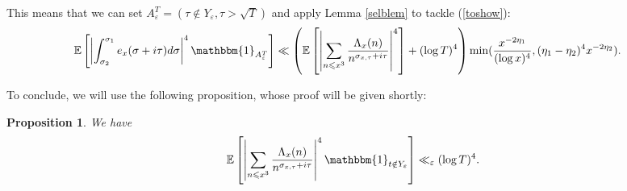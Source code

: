 \documentclass{article}
\newcommand{\1}{\mathds{1}}
\numberwithin{equation}{section}
\newcommand{\eps}{\varepsilon}
\renewcommand{\leq}{\leqslant}
\newcommand{\E}{\mathbb{E}}
\theoremstyle{plain} %
\newtheorem{proposition}[theorem]{Proposition}
\begin{document}
This means that we can set $A_\eps^T = ( \tau \notin Y_\eps, \tau > \sqrt{T})$ and apply Lemma \ref{selblem} to tackle (\ref{toshow}):
\begin{equation}
    \begin{split}
        \E\left[\left|\int_{\sigma_2}^{\sigma_1}e_x(\sigma + i \tau) d \sigma\right|^4\mathbbm{1}_{A_\eps^T}\right] & \ll \left( \E \left[ \left|\sum_{n \leq x^3} \frac{\Lambda_x(n)}{n^{\sigma_{x, \tau} + i\tau}} \right|^4 \right] + (\log T)^4\right)  \min(\frac{x^{-2\eta_1}}{(\log x)^4}, (\eta_1 - \eta_2)^4 x^{-2\eta_2}).
    \end{split}
\end{equation}

To conclude, we will use the following proposition, whose proof will be given shortly:

\begin{proposition} We have
\label{prop1}
$$\E \left[ \left| \sum_{n \leq x^3} \frac{\Lambda_x(n)}{n^{\sigma_{x, \tau} + i\tau}} \right|^4\mathbbm{1}_{t \notin Y_{\eps}}\right] \ll_\eps (\log T)^4.$$
\end{proposition}
\end{document}
